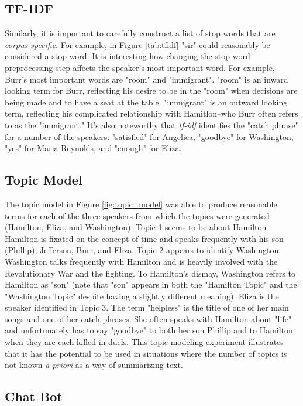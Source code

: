 \documentclass{article}
\begin{document}
\subsection{TF-IDF}

Similarly, it is important to carefully construct a list of stop words that are \emph{corpus specific}. For example, in Figure \ref{tab:tfidf} "sir" could reasonably be considered a stop word. It is interesting how changing the stop word preprocessing step affects the speaker's most important word. For example, Burr's most important words are "room" and "immigrant". "room" is an inward looking term for Burr, reflecting his desire to be in the "room" when decisions are being made and to have a seat at the table. "immigrant" is an outward looking term, reflecting his complicated relationship with Hamitlon--who Burr often refers to as the "immigrant." It's also noteworthy that \emph{tf-idf} identifies the "catch phrase" for a number of the speakers: "satisfied" for Angelica, "goodbye" for Washington, "yes" for Maria Reynolds, and "enough" for Eliza.  

\subsection{Topic Model}

The topic model in Figure \ref{fig:topic_model} was able to produce reasonable terms for each of the three speakers from which the topics were generated (Hamilton, Eliza, and Washington). Topic 1 seems to be about Hamilton--Hamilton is fixated on the concept of time and speaks frequently with his son (Phillip), Jefferson, Burr, and Eliza. Topic 2 appears to identify Washington. Washington talks frequently with Hamilton and is heavily involved with the Revolutionary War and the fighting. To Hamilton's dismay, Washington refers to Hamilton as "son" (note that "son" appears in both the "Hamilton Topic" and the "Washington Topic" despite having a slightly different meaning). Eliza is the speaker identified in Topic 3. The term "helpless" is the title of one of her main songs and one of her catch phrases. She often speaks with Hamilton about "life" and unfortunately has to say "goodbye" to both her son Phillip and to Hamilton when they are each killed in duels. This topic modeling experiment illustrates that it has the potential to be used in situations where the number of topics is not known \emph{a priori} as a way of summarizing text.

\subsection{Chat Bot}
\end{document}
